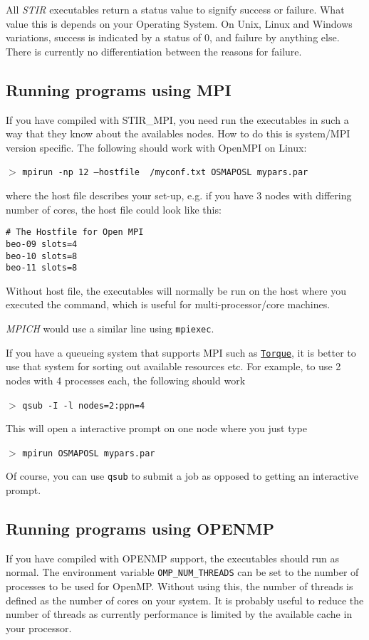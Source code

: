 \documentclass{article}
\def\R2Lurl#1#2{\mbox{\href{#1}{\tt #2}}}
\newcommand{\cmdline}[1]{\par \noindent $>$ \texttt{#1}\par}
\begin{document}
All \textit{STIR} executables return a status value to signify success 
or failure. What value this is depends on your Operating System. 
On Unix, Linux and Windows variations, success is indicated by 
a status of 0, and failure by anything else. There is currently 
no differentiation between the reasons for failure.

\subsection{
Running programs using MPI \label{sec:RunningWithMPI}}
If you have compiled with STIR\_MPI, you need run the executables in such a way that
they know about the availables nodes. How to do this is system/MPI version specific. The following
should work with OpenMPI on Linux:

\cmdline{mpirun -np 12 --hostfile ~/myconf.txt OSMAPOSL mypars.par}

\noindent 
where the host file describes your set-up, e.g. if you have 3 nodes with differing number of cores, the
host file could look like this:
\begin{verbatim}
# The Hostfile for Open MPI
beo-09 slots=4
beo-10 slots=8
beo-11 slots=8
\end{verbatim}
Without host file, the executables will normally be run on the host where you executed the command, which
is useful for multi-processor/core machines. 

\textit{MPICH} would use a similar line using \texttt{mpiexec}.

If you have a queueing system that supports MPI such as 
\R2Lurl{http://www.clusterresources.com/products/torque-resource-manager.php}{Torque}, it is better to use 
that system for sorting out available resources etc. For example, to use 2 nodes with 4 processes each,
the following should work

\cmdline{qsub -I -l nodes=2:ppn=4}

This will open a interactive prompt on one node where you just type

\cmdline{mpirun OSMAPOSL mypars.par}

Of course, you can use \texttt{qsub} to submit a job as opposed to getting an interactive prompt.

\subsection{
Running programs using OPENMP \label{sec:RunningWithOPENMP}}
If you have compiled with OPENMP support, the executables should run as normal.
The environment variable \texttt{OMP\_NUM\_THREADS} can be set to the number of processes to be used for OpenMP. 
Without using this, the number of threads is  defined as the number of cores on your system. It is probably 
useful to reduce the number of threads as currently performance is limited by the available cache in your 
processor.
\end{document}
